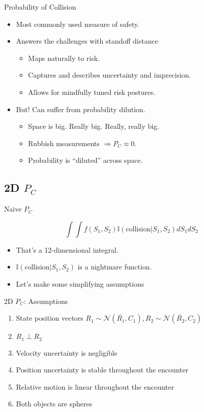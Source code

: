 \documentclass[pdf]{beamer}
\begin{document}
\begin{frame}{Probability of Collision}
  \begin{itemize}
  \item Most commonly used measure of safety.

  \item Answers the challenges with standoff distance
    \begin{itemize}
    \item Maps naturally to risk.
    \item Captures and describes uncertainty and imprecision.
    \item Allows for mindfully tuned risk postures.
    \end{itemize}

  \item But! Can suffer from probability dilution.
    \begin{itemize}
    \item Space is big. Really big. Really, really big.
    \item Rubbish measurements $\Rightarrow P_C \approx 0$.
    \item Probability is ``diluted'' across space.
    \end{itemize}
  \end{itemize}
\end{frame}

\subsection{2D $P_C$}
\begin{frame}{Naive $P_C$}

  \[ \int\int f(S_1,S_2) \mathbb{I}(\text{collision} | S_1,S_2) dS_1 dS_2 \]

  \begin{itemize}
  \item That's a 12-dimensional integral.
  \item $\mathbb{I}(\text{collision} | S_1,S_2)$ is a nightmare function.
  \item Let's make some simplifying assumptions
  \end{itemize}
\end{frame}

\begin{frame}{2D $P_C$: Assumptions}
  \begin{enumerate}
  \item State position vectors $R_1 \sim \mathcal{N}(\bar{R_1}, C_1), R_2 \sim \mathcal{N}(\bar{R_2}, C_2)$
  \item $R_1 \perp R_2$
  \item Velocity uncertainty is negligible
  \item Position uncertainty is stable throughout the encounter
  \item Relative motion is linear throughout the encounter
  \item Both objects are spheres
  \end{enumerate}
\end{frame}
\end{document}
